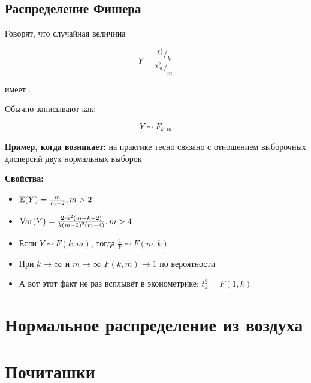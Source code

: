 \documentclass[12pt, a4paper, oneside]{article}
\begin{document}
\subsection*{Распределение Фишера}

Говорят, что случайная величина 

$$ Y = \frac{^{\chi^2_k}/_k}{^{\chi^2_m}/_m}$$

имеет .

Обычно записывают как:

$$
Y \sim F_{k,m}
$$   

\textbf{Пример, когда возникает:} на практике тесно связано с отношением выборочных дисперсий двух нормальных выборок

\textbf{Свойства:}

\begin{itemize} 
\item $\mathbb{E}(Y) = \frac{m}{m-2}, m > 2$
\item $\operatorname{Var}(Y) = \frac{2m^2(m + k - 2)}{k (m - 2)^2 (m - 4) }, m > 4$
\item Если $Y \sim F(k,m)$, тогда $\frac{1}{Y} \sim F(m,k)$
\item При $k \to \infty$ и $m \to \infty$ $F(k,m) \to 1$ по вероятности
\item А вот этот факт не раз всплывёт в эконометрике: $t_k^2 = F(1,k)$
\end{itemize} 


\section{Нормальное распределение из воздуха}


\section*{Почиташки} 

\end{document}
